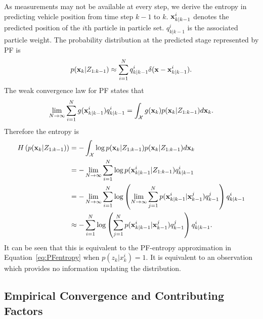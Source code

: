 As measurements may not be available at every step, we derive the entropy in predicting vehicle position from time step $k-1$ to $k$. ${\bf x}^i_{k|k-1}$ denotes the predicted position of the $i$th particle in particle set. $q^i_{k|k-1}$ is the associated particle weight. The probability distribution at the predicted stage represented by PF is
\begin{equation}
p({\bf x}_k|Z_{1:k-1})\approx\sum_{i=1}^Nq^i_{k|k-1}\delta({\bf x}-{\bf x}^i_{k|k-1} ).
\end{equation}
The weak convergence law for PF states that
\begin{equation}
\lim_{N\rightarrow\infty}\sum_{i=1}^Ng({\bf x}^i_{k|k-1} )q^i_{k|k-1}=\int_{\mathcal{X}}g({\bf x}_k)p({\bf x}_k|Z_{1:k-1})d{\bf x}_k.
\end{equation}
Therefore the entropy is
\begin{equation}
\begin{aligned}
H\left(p({\bf x}_k|Z_{1:k-1})\right)&=-\int_{\mathcal{X}}\log p({\bf x}_k|Z_{1:k-1})p({\bf x}_k|Z_{1:k-1})d{\bf x}_k \\
&=-\lim_{N\rightarrow\infty}\sum_{i=1}^N \log p({\bf x}_{k|k-1}^i |Z_{1:k-1})q_{k|k-1}^i \\
&=-\lim_{N\rightarrow\infty}\sum_{i=1}^N \log\left(\lim_{N\rightarrow\infty}\sum_{j=1}^Np({\bf x}^i_{k|k-1}|{\bf x}_{k-1}^j)q_{k-1}^j\right)q_{k|k-1}^i \\
&\approx-\sum_{i=1}^N \log\left(\sum_{j=1}^Np({\bf x}^i_{k|k-1}|{\bf x}_{k-1}^j )q_{k-1}^j\right)q_{k|k-1}^i. \\
\end{aligned}
\end{equation}
It can be seen that this is equivalent to the PF-entropy approximation in Equation~\eqref{eq:PFentropy} when $p(z_k|x_k^i)=1$. It is equivalent to an observation which provides no information updating the distribution.

\subsection{Empirical Convergence and Contributing Factors}


